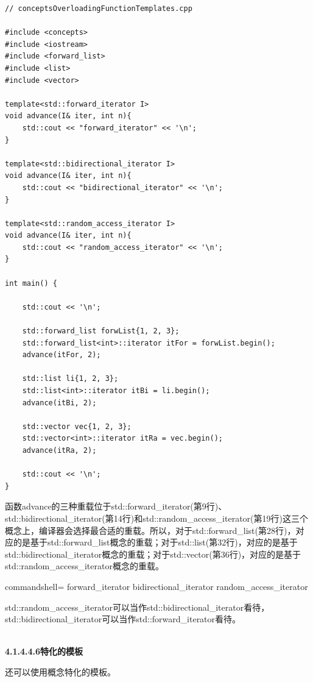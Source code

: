 \begin{lstlisting}[style=styleCXX]
// conceptsOverloadingFunctionTemplates.cpp

#include <concepts>
#include <iostream>
#include <forward_list>
#include <list>
#include <vector>

template<std::forward_iterator I>
void advance(I& iter, int n){
	std::cout << "forward_iterator" << '\n';
}

template<std::bidirectional_iterator I>
void advance(I& iter, int n){
	std::cout << "bidirectional_iterator" << '\n';
}

template<std::random_access_iterator I>
void advance(I& iter, int n){
	std::cout << "random_access_iterator" << '\n';
}

int main() {

	std::cout << '\n';

	std::forward_list forwList{1, 2, 3};
	std::forward_list<int>::iterator itFor = forwList.begin();
	advance(itFor, 2);

	std::list li{1, 2, 3};
	std::list<int>::iterator itBi = li.begin();
	advance(itBi, 2);

	std::vector vec{1, 2, 3};
	std::vector<int>::iterator itRa = vec.begin();
	advance(itRa, 2);

	std::cout << '\n';
}
\end{lstlisting}

函数advance的三种重载位于std::forward\_iterator(第9行)、std::bidirectional\_iterator(第14行)和std::random\_access\_iterator(第19行)这三个概念上，编译器会选择最合适的重载。所以，对于std::forward\_list(第28行)，对应的是基于std::forward\_list概念的重载；对于std::list(第32行)，对应的是基于std::bidirectional\_iterator概念的重载；对于std::vector(第36行)，对应的是基于std::random\_access\_iterator概念的重载。

\begin{tcblisting}{commandshell={}}
forward_iterator
bidirectional_iterator
random_access_iterator
\end{tcblisting}

std::random\_access\_iterator可以当作std::bidirectional\_iterator看待，std::bidirectional\_iterator可以当作std::forward\_iterator看待。

\hspace*{\fill} \\ %
\noindent
\textbf{4.1.4.4.6\hspace{0.2cm}特化的模板}

还可以使用概念特化的模板。

